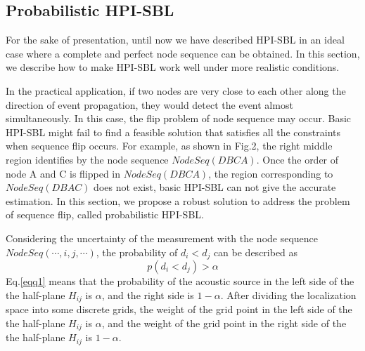 



\subsection{Probabilistic HPI-SBL}

For the sake of presentation, until now we have described HPI-SBL in an ideal case where a complete and perfect node sequence can be obtained. 
In this section, we describe how to make HPI-SBL work well under more realistic conditions. 

In the practical application, if two nodes are very close to each other along the direction of event propagation, they would detect the event almost simultaneously. 
In this case, the flip problem of node sequence may occur. 
Basic HPI-SBL might fail to find a feasible solution that satisfies all the constraints when sequence flip occurs. 
For example, as shown in Fig.2, the right middle region identifies by the node sequence $NodeSeq (D B C A)$. 
Once the order of node A and C is flipped in $NodeSeq (D B C A)$, the region corresponding to $NodeSeq (D B A C)$  does not exist, basic HPI-SBL can not give the accurate estimation.
In this section, we propose a robust solution to address the problem of sequence flip, called probabilistic HPI-SBL.

Considering the uncertainty of the measurement with the node sequence $NodeSeq( \cdots ,i,j, \cdots )$, the probability of ${d_i} < {d_j}$ can be described as  
 \begin{equation}\label{eqq1}
 p({d_i} < {d_j})>\alpha
 \end{equation}
Eq.\ref{eqq1} means that the probability of the acoustic source in the left side of the the half-plane $H_{ij}$ is $\alpha$, and the right side is $1-\alpha$. 
After dividing the localization space into some discrete grids, the weight of the grid point in the left side of the the half-plane $H_{ij}$ is $\alpha$, and the weight of the grid point in the right side of the the half-plane $H_{ij}$ is $1-\alpha$.

